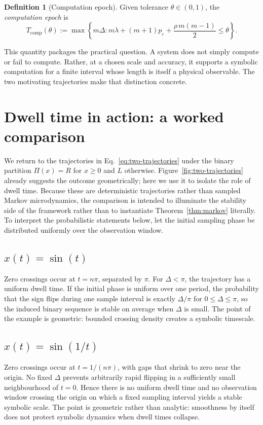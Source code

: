 \documentclass[11pt,a4paper]{article}
\theoremstyle{definition}
\newtheorem{definition}{Definition}
\theoremstyle{remark}
\newcommand{\Tc}{T_{\mathrm{comp}}}
\newcommand{\Eqref}[1]{Eq.~\eqref{#1}}
\begin{document}
\begin{definition}[Computation epoch]\label{def:epoch}
Given tolerance $\theta \in (0,1)$, the \emph{computation epoch} is
\begin{equation}\label{eq:epoch}
\Tc(\theta)
:=
\max\!\left\{
m\Delta :
m\lambda + (m+1)p_\varepsilon + \frac{\rho\,m(m-1)}{2} \leq \theta
\right\}.
\end{equation}
\end{definition}

This quantity packages the practical question. A system does not simply compute or fail to compute. Rather, at a chosen scale and accuracy, it supports a symbolic computation for a finite interval whose length is itself a physical observable. The two motivating trajectories make that distinction concrete.

\section{Dwell time in action: a worked comparison}\label{sec:example}

We return to the trajectories in \Eqref{eq:two-trajectories} under the binary partition $\Pi(x)=R$ for $x\geq 0$ and $L$ otherwise. Figure~\ref{fig:two-trajectories} already suggests the outcome geometrically; here we use it to isolate the role of dwell time. Because these are deterministic trajectories rather than sampled Markov microdynamics, the comparison is intended to illuminate the stability side of the framework rather than to instantiate Theorem~\ref{thm:markov} literally. To interpret the probabilistic statements below, let the initial sampling phase be distributed uniformly over the observation window.

\subsection{\texorpdfstring{$x(t)=\sin(t)$}{x(t)=sin(t)}}
Zero crossings occur at $t=n\pi$, separated by $\pi$. For $\Delta<\pi$, the trajectory has a uniform dwell time. If the initial phase is uniform over one period, the probability that the sign flips during one sample interval is exactly $\Delta/\pi$ for $0\leq \Delta \leq \pi$, so the induced binary sequence is stable on average when $\Delta$ is small. The point of the example is geometric: bounded crossing density creates a symbolic timescale.

\subsection{\texorpdfstring{$x(t)=\sin(1/t)$}{x(t)=sin(1/t)}}
Zero crossings occur at $t=1/(n\pi)$, with gaps that shrink to zero near the origin. No fixed $\Delta$ prevents arbitrarily rapid flipping in a sufficiently small neighbourhood of $t=0$. Hence there is no uniform dwell time and no observation window crossing the origin on which a fixed sampling interval yields a stable symbolic scale. The point is geometric rather than analytic: smoothness by itself does not protect symbolic dynamics when dwell times collapse.
\end{document}
